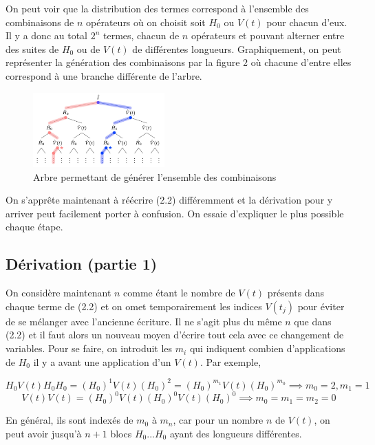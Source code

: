 On peut voir que la distribution des termes correspond à l'ensemble des combinaisons de $n$ opérateurs où on choisit soit $H_0$ ou $V(t)$ pour chacun d'eux. Il y a donc au total $2^n$ termes, chacun de $n$ opérateurs et pouvant alterner entre des suites de $H_0$ ou de $V(t)$ de différentes longueurs. Graphiquement, on peut représenter la génération des combinaisons par la figure 2 où chacune d'entre elles correspond à une branche différente de l'arbre.

\begin{figure}[H]
    \centering
     \includegraphics[width=0.45\textwidth]{images/ch2/embranchements.png}
    \caption{Arbre permettant de générer l'ensemble des combinaisons}
\end{figure}

On s'apprête maintenant à réécrire (2.2) différemment et la dérivation pour y arriver peut facilement porter à confusion. On essaie d'expliquer le plus possible chaque étape.

\subsection{Dérivation (partie 1)}
On considère maintenant $n$ comme étant le nombre de $V(t)$ présents dans chaque terme de (2.2) et on omet temporairement les indices $V(t_j)$ pour éviter de se mélanger avec l'ancienne écriture. Il ne s'agit plus du même $n$ que dans (2.2) et il faut alors un nouveau moyen d'écrire tout cela avec ce changement de variables. Pour se faire, on introduit les $m_i$ qui indiquent combien d'applications de $H_0$ il y a avant une application d'un $V(t)$. Par exemple,

\begin{equation*}
    H_0V(t)H_0H_0 = (H_0)^1V(t)(H_0)^2 = (H_0)^{m_1}V(t)(H_0)^{m_0} \implies m_0 = 2, m_1 = 1
\end{equation*}
\begin{equation*}
    V(t)V(t) = (H_0)^0V(t)(H_0)^0V(t)(H_0)^0 \implies m_0 = m_1 = m_2 = 0
\end{equation*}

En général, ils sont indexés de $m_0$ à $m_n$, car pour un nombre $n$ de $V(t)$, on peut avoir jusqu'à $n+1$ blocs $H_0...H_0$ ayant des longueurs différentes.

